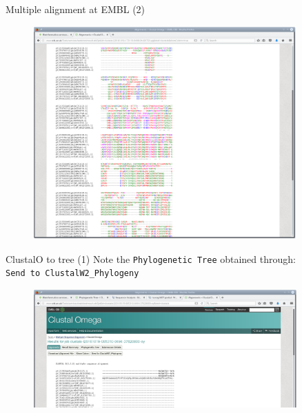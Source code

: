 \documentclass[pdf]{beamer}
\begin{document}
\begin{frame}{Multiple alignment at EMBL (2)}
  \begin{figure}[ht]
    \includegraphics[width=0.9\textwidth]{images/ebi_clustalo_result}
  \end{figure}
\end{frame}

\begin{frame}{ClustalO to tree (1)}
  Note the \texttt{Phylogenetic Tree} obtained through:\\
  \texttt{Send to ClustalW2\_Phylogeny}
  \begin{figure}[ht]
    \includegraphics[width=0.9\textwidth]{images/ebi_clustalo_result_3.png}
  \end{figure}
\end{frame}
\end{document}
